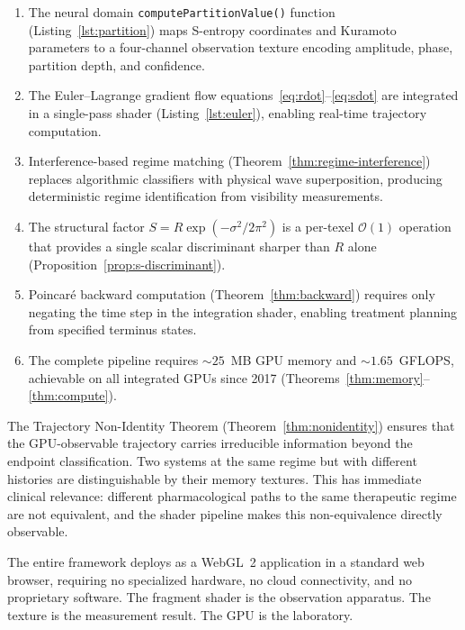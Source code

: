 \documentclass[11pt,twocolumn,a4paper]{article}
\newcommand{\BigO}{\mathcal{O}}
\begin{document}
\begin{enumerate}[leftmargin=*,itemsep=2pt]
\item The neural domain \texttt{computePartitionValue()} function (Listing~\ref{lst:partition}) maps S-entropy coordinates and Kuramoto parameters to a four-channel observation texture encoding amplitude, phase, partition depth, and confidence.

\item The Euler--Lagrange gradient flow equations~\eqref{eq:rdot}--\eqref{eq:sdot} are integrated in a single-pass shader (Listing~\ref{lst:euler}), enabling real-time trajectory computation.

\item Interference-based regime matching (Theorem~\ref{thm:regime-interference}) replaces algorithmic classifiers with physical wave superposition, producing deterministic regime identification from visibility measurements.

\item The structural factor $S = R\exp(-\sigma^2/2\pi^2)$ is a per-texel $\BigO(1)$ operation that provides a single scalar discriminant sharper than $R$ alone (Proposition~\ref{prop:s-discriminant}).

\item Poincar\'{e} backward computation (Theorem~\ref{thm:backward}) requires only negating the time step in the integration shader, enabling treatment planning from specified terminus states.

\item The complete pipeline requires $\sim\!25$~MB GPU memory and $\sim\!1.65$~GFLOPS, achievable on all integrated GPUs since 2017 (Theorems~\ref{thm:memory}--\ref{thm:compute}).
\end{enumerate}

The Trajectory Non-Identity Theorem (Theorem~\ref{thm:nonidentity}) ensures that the GPU-observable trajectory carries irreducible information beyond the endpoint classification.
Two systems at the same regime but with different histories are distinguishable by their memory textures.
This has immediate clinical relevance: different pharmacological paths to the same therapeutic regime are not equivalent, and the shader pipeline makes this non-equivalence directly observable.

The entire framework deploys as a WebGL~2 application in a standard web browser, requiring no specialized hardware, no cloud connectivity, and no proprietary software.
The fragment shader is the observation apparatus.
The texture is the measurement result.
The GPU is the laboratory.




\end{document}
